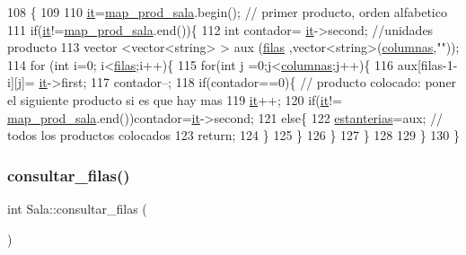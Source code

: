 \begin{DoxyCode}
108                       \{
109    
110     \hyperlink{class_sala_a1cc789ab041a9e3011f9eec9357e8fb0}{it}=\hyperlink{class_sala_a1ee09851cf1735dc48ab69a91952e250}{map\_prod\_sala}.begin();   \textcolor{comment}{// primer producto, orden alfabetico}
111     \textcolor{keywordflow}{if}(\hyperlink{class_sala_a1cc789ab041a9e3011f9eec9357e8fb0}{it}!=\hyperlink{class_sala_a1ee09851cf1735dc48ab69a91952e250}{map\_prod\_sala}.end())\{
112         \textcolor{keywordtype}{int} contador= \hyperlink{class_sala_a1cc789ab041a9e3011f9eec9357e8fb0}{it}->second;  \textcolor{comment}{//unidades producto}
113         vector <vector<string> > aux (\hyperlink{class_sala_a4cccb03763eea3ebd6d192491b25f7dc}{filas} ,vector<string>(\hyperlink{class_sala_af3c278931f26e28e77fa363e9be82000}{columnas},\textcolor{stringliteral}{""}));
114         \textcolor{keywordflow}{for} (\textcolor{keywordtype}{int} i=0; i<\hyperlink{class_sala_a4cccb03763eea3ebd6d192491b25f7dc}{filas};i++)\{
115             \textcolor{keywordflow}{for}(\textcolor{keywordtype}{int} j =0;j<\hyperlink{class_sala_af3c278931f26e28e77fa363e9be82000}{columnas};j++)\{
116                 aux[filas-1-i][j]= \hyperlink{class_sala_a1cc789ab041a9e3011f9eec9357e8fb0}{it}->first;
117                 contador--;
118                 \textcolor{keywordflow}{if}(contador==0)\{ \textcolor{comment}{// producto colocado: poner el siguiente producto si es que hay mas}
119                     \hyperlink{class_sala_a1cc789ab041a9e3011f9eec9357e8fb0}{it}++;
120                     \textcolor{keywordflow}{if}(\hyperlink{class_sala_a1cc789ab041a9e3011f9eec9357e8fb0}{it}!= \hyperlink{class_sala_a1ee09851cf1735dc48ab69a91952e250}{map\_prod\_sala}.end())contador=\hyperlink{class_sala_a1cc789ab041a9e3011f9eec9357e8fb0}{it}->second;
121                     \textcolor{keywordflow}{else}\{
122                         \hyperlink{class_sala_a88aae17b7e590770fe8115b41da2e26a}{estanterias}=aux;  \textcolor{comment}{// todos los productos colocados}
123                         \textcolor{keywordflow}{return};
124                     \}
125                 \}
126             \}
127         \}
128          
129     \}
130 \}
\end{DoxyCode}
\mbox{\label{class_sala_a71a568ec948b6a417a055f1e5fba6836}} 
\subsubsection{\texorpdfstring{consultar\+\_\+filas()}{consultar\_filas()}}
{\footnotesize\ttfamily int Sala\+::consultar\+\_\+filas (\begin{DoxyParamCaption}{ }\end{DoxyParamCaption})}



